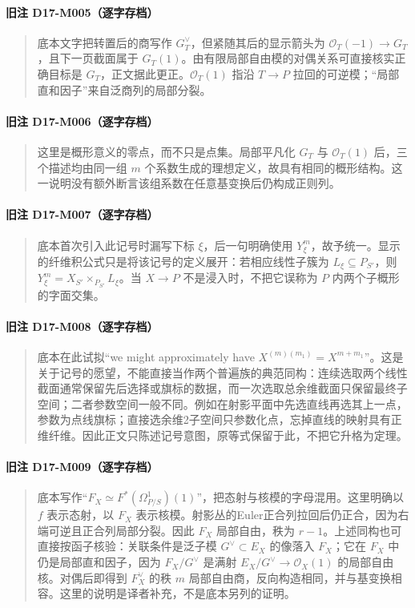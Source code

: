 \paragraph*{旧注 D17-M005（逐字存档）}
\begin{quote}
底本文字把转置后的商写作 $G_T^\vee$，但紧随其后的显示箭头为 $\mathcal O_T(-1)\to G_T$，且下一页截面属于 $G_T(1)$。由有限局部自由模的对偶关系可直接核实正确目标是 $G_T$，正文据此更正。$\mathcal O_T(1)$ 指沿 $T\to P$ 拉回的可逆模；“局部直和因子”来自泛商列的局部分裂。
\end{quote}

\paragraph*{旧注 D17-M006（逐字存档）}
\begin{quote}
这里是概形意义的零点，而不只是点集。局部平凡化 $G_T$ 与 $\mathcal O_T(1)$ 后，三个描述均由同一组 $m$ 个系数生成的理想定义，故具有相同的概形结构。这一说明没有额外断言该组系数在任意基变换后仍构成正则列。
\end{quote}

\paragraph*{旧注 D17-M007（逐字存档）}
\begin{quote}
底本首次引入此记号时漏写下标 $\xi$，后一句明确使用 $Y^m_\xi$，故予统一。显示的纤维积公式只是将该记号的定义展开：若相应线性子簇为 $L_\xi\subseteq P_{S'}$，则 $Y^m_\xi=X_{S'}\times_{P_{S'}}L_\xi$。当 $X\to P$ 不是浸入时，不把它误称为 $P$ 内两个子概形的字面交集。
\end{quote}

\paragraph*{旧注 D17-M008（逐字存档）}
\begin{quote}
底本在此试拟“we might approximately have $X^{(m)(m_1)}=X^{m+m_1}$”。这是关于记号的愿望，不能直接当作两个普遍族的典范同构：连续选取两个线性截面通常保留先后选择或旗标的数据，而一次选取总余维截面只保留最终子空间；二者参数空间一般不同。例如在射影平面中先选直线再选其上一点，参数为点线旗标；直接选余维2子空间只参数化点，忘掉直线的映射具有正维纤维。因此正文只陈述记号意图，原等式保留于此，不把它升格为定理。
\end{quote}

\paragraph*{旧注 D17-M009（逐字存档）}
\begin{quote}
底本写作“$F_X\simeq F^*(\Omega^1_{P/S})(1)$”，把态射与核模的字母混用。这里明确以 $f$ 表示态射，以 $F_X$ 表示核模。射影丛的Euler正合列拉回后仍正合，因为右端可逆且正合列局部分裂。因此 $F_X$ 局部自由，秩为 $r-1$。上述同构也可直接按函子核验：关联条件是泛子模 $G^\vee\subset E_X$ 的像落入 $F_X$；它在 $F_X$ 中仍是局部直和因子，因为 $F_X/G^\vee$ 是满射 $E_X/G^\vee\to\mathcal O_X(1)$ 的局部自由核。对偶后即得到 $F_X^\vee$ 的秩 $m$ 局部自由商，反向构造相同，并与基变换相容。这里的说明是译者补充，不是底本另列的证明。
\end{quote}


